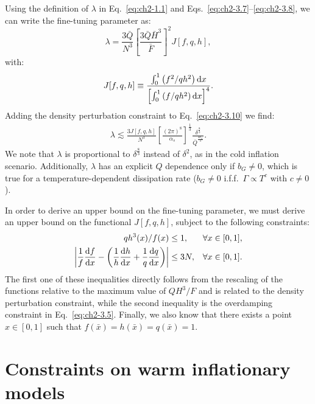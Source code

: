 Using the definition of $\lambda$ in Eq.~\ref{eq:ch2-1.1} and Eqs.~\ref{eq:ch2-3.7}--\ref{eq:ch2-3.8}, we can write the fine-tuning parameter as:
\begin{equation}
\lambda=\frac{3\bar{Q}}{N^{3}}\left[\frac{3 \bar{Q}\bar{H}^{3}}{\bar{F}}\right]^{2} J[f,q,h], \label{eq:ch2-3.10}
\end{equation}
with:
\begin{equation}
J[f, q,h] \equiv \frac{\int_{0}^{1}\left(f^{2} / qh^{2}\right) {\rm d} x}{\left[\int_{0}^{1}\left(f / qh^{2}\right) {\rm d} x\right]^{4}}. \label{eq:ch2-3.11}
\end{equation}
Adding the density perturbation constraint to Eq.~\ref{eq:ch2-3.10} we find:
\begin{align}
    \lambda\lesssim \frac{3 J[f,q,h]}{N^3} \left[\frac{(2\pi)^8}{\alpha_s}\right]^{\frac{1}{3}} \frac{\delta^{\frac{8}{3}}}{\bar{Q}^{\frac{4b_G}{3}}}. \label{eq:ch2-3.12}
\end{align}
We note that $\lambda$ is proportional to $\delta^{\frac{8}{3}}$ instead of $\delta^2$, as in the cold inflation scenario. Additionally, $\lambda$ has an explicit $Q$ dependence only if $b_G\neq 0$, which is true for a temperature-dependent dissipation rate ($b_G\neq0$ i.f.f.\ $\Gamma\propto T^c$ with $c\neq0$).

In order to derive an upper bound on the fine-tuning
parameter, we must derive an upper bound on the functional
$J[f,q,h]$, subject to the following constraints:
\begin{align}
qh^{3}(x) / f(x) &\leq 1, &  \forall x \in[0,1], \label{eq:ch2-3.13} \\
\left|\frac{1}{f} \frac{{\rm d} f}{{\rm d} x}-\left(\frac{1}{h} \frac{{\rm d} h}{{\rm d} x}+\frac{1}{q} \frac{{\rm d} q}{{\rm d} x}\right)\right| &\leq 3 N, &  \forall x \in[0,1]. \label{eq:ch2-3.14}
\end{align}
The first one of these inequalities directly follows from the rescaling of the functions relative to the maximum value of $QH^3/F$ and is related to the density perturbation constraint, while the second inequality is the overdamping constraint in Eq.~\ref{eq:ch2-3.5}. Finally, we also know that there exists a point $x\in[0, 1]$ such that $f(\bar{x})=h(\bar{x})=q(\bar{x})=1$.

\section{Constraints on warm inflationary models} \label{sec:ch2-4}

